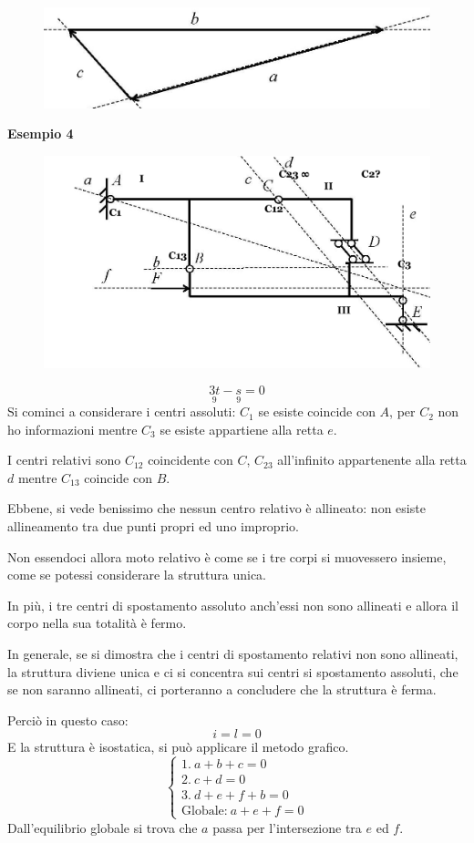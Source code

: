 \documentclass{article}
\begin{document}
\begin{adjustwidth}{2in}{}
\begin{figure}[H]
	\centering
	\includegraphics[width=0.4\linewidth]{immagini/1.PARTE4_Pagina_32}
\end{figure}
\newpage
\textbf{Esempio 4} \newline
\begin{figure}[H]
	\centering
	\includegraphics[width=0.5\linewidth]{immagini/1.PARTE4_Pagina_33.1}
\end{figure}
\[\underset{9}{3t} - \underset{9}{s} = 0\]
Si cominci a considerare i centri assoluti: $C_1$ se esiste coincide con $A$, per $C_2$ non ho informazioni mentre $C_3$ se esiste appartiene alla retta $e$.

I centri relativi sono $C_{12}$ coincidente con $C$, $C_{23}$ all'infinito appartenente alla retta $d$ mentre $C_{13}$ coincide con $B$. \newline 

Ebbene, si vede benissimo che nessun centro relativo è allineato: non esiste allineamento tra due punti propri ed uno improprio.

 Non essendoci allora moto relativo è come se i tre corpi si muovessero insieme, come se potessi considerare la struttura unica. 

In più, i tre centri di spostamento assoluto anch'essi non sono allineati e allora il corpo nella sua totalità è fermo. \newline 

In generale, se si dimostra che i centri di spostamento relativi non sono allineati, la struttura diviene unica e ci si concentra sui centri si spostamento assoluti, che se non saranno allineati, ci porteranno a concludere che la struttura è ferma. \newline 

Perciò in questo caso:
\[i=l=0\]
E la struttura è isostatica, si può applicare il metodo grafico. 
\[\begin{cases}
	1. ~ a + b+ c = 0\\
	2. ~ c + d  = 0 \\
	3. ~ d + e+ f +b = 0 \\
	\text{Globale:} ~ a + e + f = 0
\end{cases}\]
Dall'equilibrio globale si trova che $a$ passa per l'intersezione tra $e$ ed $f$.


\end{adjustwidth}
\end{document}
